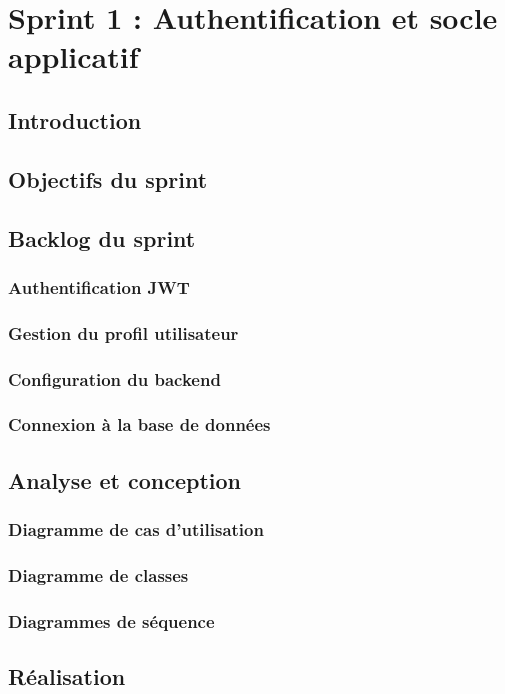 \documentclass[12pt,a4paper]{report}
\begin{document}

\chapter{Sprint 1 : Authentification et socle applicatif}

\section{Introduction}
\section{Objectifs du sprint}
\section{Backlog du sprint}
\subsection{Authentification JWT}
\subsection{Gestion du profil utilisateur}
\subsection{Configuration du backend}
\subsection{Connexion à la base de données}
\section{Analyse et conception}
\subsection{Diagramme de cas d'utilisation}
\subsection{Diagramme de classes}
\subsection{Diagrammes de séquence}
\section{Réalisation}
\end{document}
